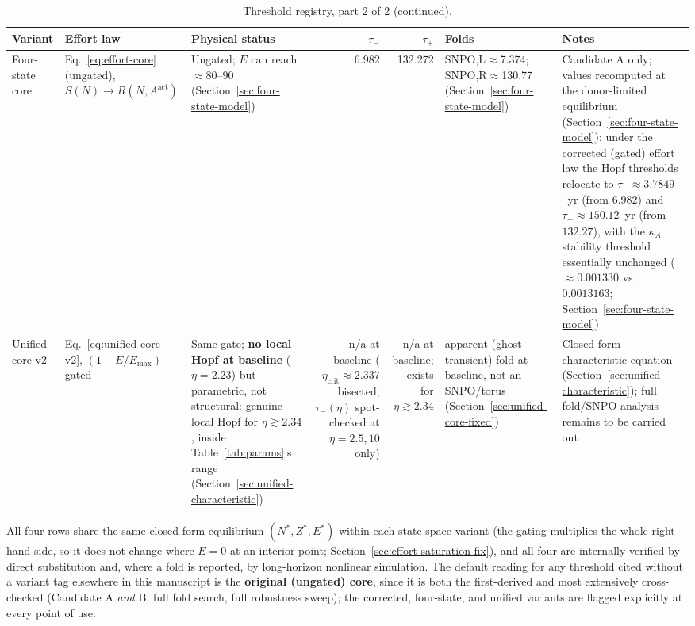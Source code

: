 \documentclass[twocolumn,10pt]{article}
\begin{document}
\begin{table}[t]
\footnotesize
\caption{Threshold registry, part 2 of 2 (continued).}
\label{tab:threshold-registry-2}
\begin{tabularx}{\textwidth}{@{}p{1.9cm}p{3.5cm}Xrrp{2.3cm}X@{}}
\toprule
\textbf{Variant} & \textbf{Effort law} & \textbf{Physical status} & $\tau_-$ & $\tau_+$ & Folds & \textbf{Notes} \\
\midrule
Four-state core & Eq.~\eqref{eq:effort-core} (ungated), $S(N)\to R(N,A^{\text{act}})$ & Ungated; $E$ can reach $\approx$80--90 (Section~\ref{sec:four-state-model}) & 6.982 & 132.272 & SNPO,L$\approx$7.374; SNPO,R$\approx$130.77 (Section~\ref{sec:four-state-model}) & Candidate A only; values recomputed at the donor-limited equilibrium (Section~\ref{sec:four-state-model}); under the corrected (gated) effort law the Hopf thresholds relocate to $\tau_-\approx3.7849$~yr (from $6.982$) and $\tau_+\approx150.12$~yr (from $132.27$), with the $\kappa_A$ stability threshold essentially unchanged ($\approx0.001330$ vs $0.0013163$; Section~\ref{sec:four-state-model}) \\
Unified core v2 & Eq.~\eqref{eq:unified-core-v2}, $(1-E/E_{\max})$-gated & Same gate; \textbf{no local Hopf at baseline} ($\eta=2.23$) but parametric, not structural: genuine local Hopf for $\eta\gtrsim2.34$, inside Table~\ref{tab:params}'s range (Section~\ref{sec:unified-characteristic}) & n/a at baseline ($\eta_{\text{crit}}\approx2.337$ bisected; $\tau_-(\eta)$ spot-checked at $\eta=2.5,10$ only) & n/a at baseline; exists for $\eta\gtrsim2.34$ & apparent (ghost-transient) fold at baseline, not an SNPO/torus (Section~\ref{sec:unified-core-fixed}) & Closed-form characteristic equation (Section~\ref{sec:unified-characteristic}); full fold/SNPO analysis remains to be carried out \\
\bottomrule
\end{tabularx}
\end{table}
All four rows share the same closed-form equilibrium $(N^*,Z^*,E^*)$ within each state-space variant (the gating multiplies the whole right-hand side, so it does not change where $\dot E=0$ at an interior point; Section~\ref{sec:effort-saturation-fix}), and all four are internally verified by direct substitution and, where a fold is reported, by long-horizon nonlinear simulation. The default reading for any threshold cited without a variant tag elsewhere in this manuscript is the \textbf{original (ungated) core}, since it is both the first-derived and most extensively cross-checked (Candidate A \emph{and} B, full fold search, full robustness sweep); the corrected, four-state, and unified variants are flagged explicitly at every point of use.
\end{document}

